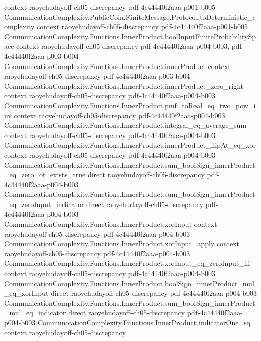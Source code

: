 \begin{lemma}
  {context}
  {raoyehudayoff-ch05-discrepancy}
  {pdf-4c44440f2aaa-p001-b005}
\proofstep
  {CommunicationComplexity.PublicCoin.FiniteMessage.Protocol.toDeterministic_complexity}
  {context}
  {raoyehudayoff-ch05-discrepancy}
  {pdf-4c44440f2aaa-p001-b005}
\proofstep
  {CommunicationComplexity.Functions.InnerProduct.boolInputFiniteProbabilitySpace}
  {context}
  {raoyehudayoff-ch05-discrepancy}
  {pdf-4c44440f2aaa-p004-b003,
    pdf-4c44440f2aaa-p003-b004}
\proofstep
  {CommunicationComplexity.Functions.InnerProduct.innerProduct}
  {context}
  {raoyehudayoff-ch05-discrepancy}
  {pdf-4c44440f2aaa-p003-b004}
\proofstep
  {CommunicationComplexity.Functions.InnerProduct.innerProduct_zero_right}
  {context}
  {raoyehudayoff-ch05-discrepancy}
  {pdf-4c44440f2aaa-p004-b003}
\proofstep
  {CommunicationComplexity.Functions.InnerProduct.pmf_toReal_eq_two_pow_inv}
  {context}
  {raoyehudayoff-ch05-discrepancy}
  {pdf-4c44440f2aaa-p004-b003}
\proofstep
  {CommunicationComplexity.Functions.InnerProduct.integral_eq_average_sum}
  {context}
  {raoyehudayoff-ch05-discrepancy}
  {pdf-4c44440f2aaa-p004-b003}
\proofstep
  {CommunicationComplexity.Functions.InnerProduct.innerProduct_flipAt_eq_xor}
  {context}
  {raoyehudayoff-ch05-discrepancy}
  {pdf-4c44440f2aaa-p004-b003}
\proofstep
  {CommunicationComplexity.Functions.InnerProduct.sum_boolSign_innerProduct_eq_zero_of_exists_true}
  {direct}
  {raoyehudayoff-ch05-discrepancy}
  {pdf-4c44440f2aaa-p004-b003}
\proofstep
  {CommunicationComplexity.Functions.InnerProduct.sum_boolSign_innerProduct_eq_zeroInput_indicator}
  {direct}
  {raoyehudayoff-ch05-discrepancy}
  {pdf-4c44440f2aaa-p004-b003}
\proofstep
  {CommunicationComplexity.Functions.InnerProduct.xorInput}
  {context}
  {raoyehudayoff-ch05-discrepancy}
  {pdf-4c44440f2aaa-p004-b003}
\proofstep
  {CommunicationComplexity.Functions.InnerProduct.xorInput_apply}
  {context}
  {raoyehudayoff-ch05-discrepancy}
  {pdf-4c44440f2aaa-p004-b003}
\proofstep
  {CommunicationComplexity.Functions.InnerProduct.xorInput_eq_zeroInput_iff}
  {context}
  {raoyehudayoff-ch05-discrepancy}
  {pdf-4c44440f2aaa-p004-b003}
\proofstep
  {CommunicationComplexity.Functions.InnerProduct.boolSign_innerProduct_mul_eq_xorInput}
  {direct}
  {raoyehudayoff-ch05-discrepancy}
  {pdf-4c44440f2aaa-p004-b003}
\proofstep
  {CommunicationComplexity.Functions.InnerProduct.sum_boolSign_innerProduct_mul_eq_indicator}
  {direct}
  {raoyehudayoff-ch05-discrepancy}
  {pdf-4c44440f2aaa-p004-b003}
\proofstep
  {CommunicationComplexity.Functions.InnerProduct.indicatorOne_sq}
  {context}
  {raoyehudayoff-ch05-discrepancy}

\end{lemma}
